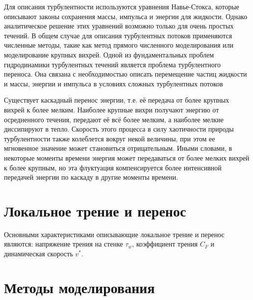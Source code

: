 	Для описания турбулентности используются уравнения Навье-Стокса, которые описывают законы сохранения массы, импульса и энергии для жидкости. Однако аналитическое решение этих уравнений возможно только для очень простых течений. В общем случае для описания турбулентных потоков применяются численные методы, такие как метод прямого численного моделирования или моделирование крупных вихрей. Одной из фундаментальных проблем гидродинамики турбулентных течений является проблема турбулентного переноса. Она связана с необходимостью описать перемещение частиц жидкости и массы, энергии и импульса в условиях сложных турбулентных потоков
	
	Существует каскадный перенос энергии, т.е. её передача от более крупных вихрей к более мелким. Наиболее крупные вихри получают энергию от осредненного течения, передают её всё более мелким, а наиболее мелкие диссипируют в тепло. Скорость этого процесса в силу хаотичности природы турбулентности также колеблется вокруг некой величины, при этом ее мгновенное значение может становиться отрицательным. Иными словами, в некоторые моменты времени энергия может передаваться от более мелких вихрей к более крупным, но эта флуктуация компенсируется более интенсивной передачей энергии по каскаду в другие моменты времени.

\section{Локальное трение и перенос}
	Основными характеристиками описывающие локальное трение и перенос являются: напряжение трения на стенке $\tau_w$, коэффициент трения $C_F$ и динамическая скорость $v^*$.  

\section{Методы моделирования}
	
